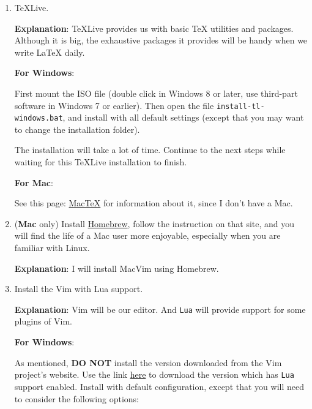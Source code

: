 \documentclass{article}
\begin{document}
\begin{enumerate}
    \item \TeX Live.

        \textbf{Explanation}: \TeX Live provides us with basic \TeX
        utilities and packages. Although it is big, the exhaustive
        packages it provides will be handy when we write \LaTeX{} daily.

        \textbf{For Windows}:

        First mount the ISO file (double click in Windows 8 or later,
        use third-part software in Windows 7 or earlier). Then open
        the file \texttt{install-tl-windows.bat}, and install with all
        default settings (except that you may want to change the
        installation folder).

        The installation will take a lot of time. Continue to the next
        steps while waiting for this \TeX Live installation to finish.

        \textbf{For Mac}:

        See this page: \href{https://www.tug.org/mactex/}{Mac\TeX} for
        information about it, since I don't have a Mac.

    \item (\textbf{Mac} only) Install
        \href{https://brew.sh}{Homebrew}, follow the instruction on
        that site, and you will find the life of a Mac user more
        enjoyable, especially when you are familiar with Linux.

        \textbf{Explanation}: I will install MacVim using Homebrew.

    \item Install the Vim with Lua support. 

        \textbf{Explanation}: Vim will be our editor. And \texttt{Lua}
        will provide support for some plugins of Vim.
        
        \textbf{For Windows}:

        As mentioned, \textbf{DO NOT} install the version downloaded
        from the Vim project's website. Use the link
        \href{https://github.com/vim/vim-win32-installer/releases/}{here}
        to download the version which has \texttt{Lua} support
        enabled. Install with default configuration, except that you
        will need to consider the following options:


\end{enumerate}
\end{document}
